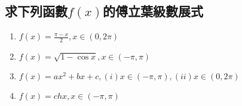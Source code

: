 \documentclass[a4paper,12pt]{article}
\begin{document}
\begin{CJK*}{UTF8}{bsmi}
\section{求下列函數$f(x)$的傅立葉級數展式}
    \begin{enumerate}[label={\rm(\arabic*)}]
        \item $\displaystyle f(x) = \frac{\pi - x}{2}, x \in (0, 2\pi)$
        \item $\displaystyle f(x) = \sqrt{1 - \cos x}, x \in (-\pi, \pi)$
        \item $\displaystyle f(x) = ax^2 + bx + c, (i)x \in (-\pi, \pi), 
                (ii) x \in (0, 2\pi)$
        \item $\displaystyle f(x) = ch x, x \in (-\pi, \pi)$
    \end{enumerate}

\end{CJK*}
\end{document}
